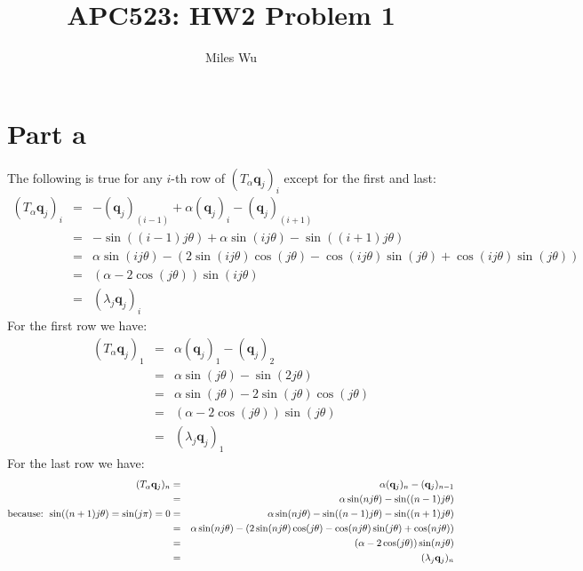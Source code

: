 \documentclass[11pt]{article}
\begin{document}
\title{APC523: HW2 Problem 1}
\author{Miles Wu}
\maketitle

\section{Part a}
The following is true for any $i$-th row of $(T_\alpha \mathbf{q}_j)_i$ except for the first and last:
\begin{eqnarray*}
(T_\alpha \mathbf{q}_j)_i &=& - (\mathbf{q}_j)_{(i-1)} + \alpha (\mathbf{q}_j)_i - (\mathbf{q}_j)_{(i+1)} \\
&=&  - \sin ((i-1) j \theta) + \alpha \sin (i j \theta) - \sin ((i+1) j \theta) \\
&=& \alpha \sin (i j \theta) - \left(2 \sin(i j \theta) \cos(j \theta) - \cos(i j \theta) \sin(j \theta) + \cos(i j \theta) \sin(j \theta)\right)\\
&=& (\alpha - 2 \cos(j \theta)) \sin(i j \theta) \\
&=& (\lambda_j \mathbf{q}_j)_i
\end{eqnarray*}
For the first row we have:
\begin{eqnarray*}
(T_\alpha \mathbf{q}_j)_1 &=& \alpha (\mathbf{q}_j)_1 - (\mathbf{q}_j)_2 \\
&=&  \alpha \sin (j \theta) - \sin (2 j \theta) \\
&=& \alpha \sin (j \theta) - 2 \sin(j \theta) \cos (j \theta)\\
&=& (\alpha - 2 \cos(j \theta)) \sin(j \theta) \\
&=& (\lambda_j \mathbf{q}_j)_1
\end{eqnarray*}
For the last row we have: 
\begin{eqnarray*}
(T_\alpha \mathbf{q}_j)_n &=& \alpha (\mathbf{q}_j)_n - (\mathbf{q}_j)_{n-1} \\
&=&  \alpha \sin (n j \theta) - \sin ((n-1) j \theta) \\
\textnormal{because: } \sin ((n+1)j \theta) = \sin (j \pi) = 0
&=&  \alpha \sin (n j \theta) - \sin ((n-1) j \theta) - \sin ( (n+1) j \theta) \\
&=& \alpha \sin (n j \theta) - \left(2 \sin(n j \theta) \cos(j \theta) - \cos(n j \theta) \sin(j \theta) + \cos(n j \theta) \right)\\
&=& (\alpha - 2 \cos(j \theta)) \sin(n j \theta) \\
&=& (\lambda_j \mathbf{q}_j)_n
\end{eqnarray*}
\end{document}
